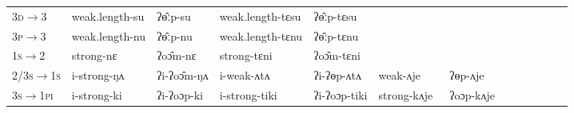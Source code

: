 \documentclass[oldfontcommands,oneside,a4paper,11pt]{article}
\newcommand{\ipa}[1]{{\phon \mbox{#1}}} %
\newcommand{\grise}[1]{\cellcolor{lightgray}\textbf{#1}}
\begin{document}
\begin{table}[h]
{\begin{tabular}{lllllllllllll}
\textsc{3d}$\rightarrow$3   & 	 weak.length-\ipa{su}   \grise{} & 	\ipa{ʔɵ̂ːp-su} \grise{}  & 	 weak.length-\ipa{tɛsu} \grise{}    & 	\ipa{ʔɵ̂ːp-tɛsu} \grise{}  & 	  & 	  & 	\\
\textsc{3p}$\rightarrow$3   & 	 weak.length-\ipa{nu} \grise{}   & 	\ipa{ʔɵ̂ːp-nu} \grise{}  & 	 weak.length-\ipa{tɛnu}\grise{}   & 	\ipa{ʔɵ̂ːp-tɛnu} \grise{}  & 	  & 	  & 	\\
\textsc{1s}$\rightarrow$2   & 	 strong-\ipa{nɛ}   & 	\ipa{ʔoɔ̂m-nɛ}  & 	 strong-\ipa{tɛni}  & 	\ipa{ʔoɔ̂m-tɛni}  & 	  & 	  & 	\\
\textsc{2/3s$\rightarrow$1s}   & 	 \ipa{i}-strong-\ipa{ŋʌ}   & 	\ipa{ʔi-ʔoɔ̂m-ŋʌ}  & 	 \ipa{i}-weak-\ipa{ʌtʌ}   & 	\ipa{ʔi-ʔɵp-ʌtʌ}  & 	 weak-\ipa{ʌje}  & 	\ipa{ʔɵp-ʌje}  & 	\\
\textsc{3s$\rightarrow$1pi}   & 	 \ipa{i}-strong-\ipa{ki}   & 	\ipa{ʔi-ʔoɔp-ki}  & 	 \ipa{i}-strong-\ipa{tiki}   & 	\ipa{ʔi-ʔoɔp-tiki}  & 	 strong-\ipa{kʌje}\  & 	\ipa{ʔoɔp-kʌje}  & 	\\
\bottomrule
\end{tabular}}
\end{table}
\end{document}
